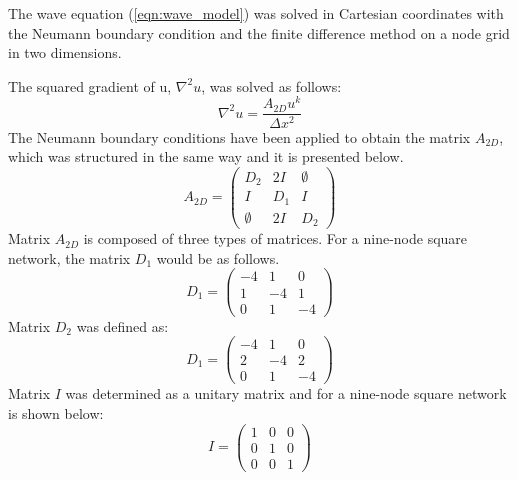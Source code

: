 \documentclass[12pt, a4paper]{article} %
\begin{document}
	\normalsize 
	
	\setlength{\parskip}{4mm}
	
	The wave equation (\ref{eqn:wave_model}) was solved in Cartesian coordinates with the Neumann boundary condition and the finite difference method on a node grid in two dimensions. 
	
	\setlength{\parindent}{8pt}
	
	The squared gradient of u, $\nabla^{2}u$, was solved as follows:
	\begin{equation} \label{eqn:nabla2u}
		\nabla^{2}u = \frac{A_{2D}u^{k}}{\Delta x^{2}}
	\end{equation}
	The Neumann boundary conditions have been applied to obtain the matrix $A_{2D}$, which was structured in the same way and it is presented below.
	\begin{equation} \label{eqn:matrixA}
		A_{2D} = 
		\begin{pmatrix}
			D_{2} & 2I & \emptyset\\
			I & D_{1} & I\\
			\emptyset & 2I & D_{2}
		\end{pmatrix}
	\end{equation}
	Matrix $A_{2D}$ is composed of three types of matrices. For a nine-node square network, the matrix $D_{1}$ would be as follows.
	\begin{equation} \label{eqn:matrixD1}
		D_{1} = 
		\begin{pmatrix}
			-4 & 1 & 0\\
			1 & -4 & 1\\
			0 & 1 & -4
		\end{pmatrix}
	\end{equation}
	Matrix $D_{2}$ was defined as:
	\begin{equation} \label{eqn:matrixD2}
		D_{1} = 
		\begin{pmatrix}
			-4 & 1 & 0\\
			2 & -4 & 2\\
			0 & 1 & -4
		\end{pmatrix}
	\end{equation}
	Matrix $I$ was determined as a unitary matrix and for a nine-node square network is shown below:
	\begin{equation} \label{eqn:matrixI}
		I = 
		\begin{pmatrix}
			1 & 0 & 0\\
			0 & 1 & 0\\
			0 & 0 & 1
		\end{pmatrix}
	\end{equation}
\end{document}
